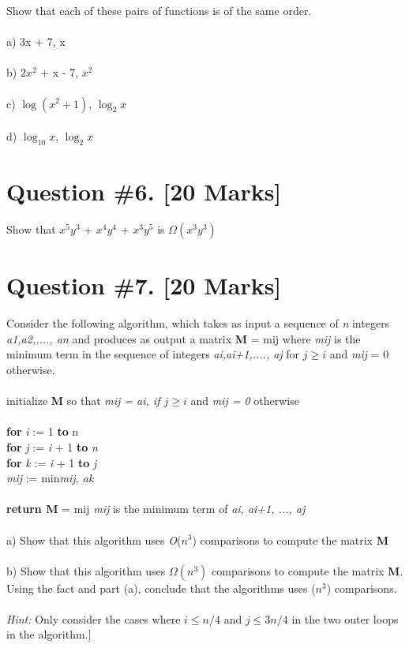 \documentclass{article}
\begin{document}
Show that each of these pairs of functions is of the same order. \\ \\
a) 3x + 7, x \\\\
b) 2$x^2$ + x - 7, $x^2$ \\ \\ 
c) $\log(x^2 + 1 )$, $\log_{2}{x}$ \\ \\ 
d) $\log_{10}{x}$, $\log_{2}{x}$
\newpage 
\section{Question \#6. [20 Marks]}

Show that $x^5$$y^3$ + $x^4$$y^4$ + $x^3$$y^5$ is $\Omega(x^3y^3)$
\newpage
\section{Question \#7. [20 Marks]}
Consider the following algorithm, which takes as input a sequence of \emph{n} integers \emph{a1,a2,...., an} and produces as output a matrix \textbf{M} = {mij} where \emph{mij} is the minimum term in the sequence of integers \emph{ai,ai+1,...., aj} for \emph {$j \geq i$} and \emph {mij} = 0 otherwise. \\ \\ \indent initialize \textbf {M} so that \emph{mij = ai, if $j \geq i$} and \emph{mij = 0 }otherwise \\ \\ \indent \textbf{for} \emph{i} := 1 \textbf {to} n \\ 
\indent \indent \textbf {for} \emph{j} := \emph {i} + 1 \textbf{to} \emph{n} \\ 
\indent \indent \indent \textbf {for} \emph{k} := \emph {i} + 1 \textbf{to} \emph{j} \\ 
\indent \indent \indent \indent \emph{mij} := min\emph{mij, ak} \\ \\ 
\indent \textbf{return M} = {mij} {\emph{mij} is the minimum term of \emph{ai, ai+1, ..., aj}} \\ \\ 
a) Show that this algorithm uses \emph{O}($n^3$) comparisons to compute the matrix \textbf {M} \\ \\ 
b) Show that this algorithm uses $\Omega(n^3)$ comparisons to compute the matrix \textbf {M}. Using the fact and part (a), conclude that the algorithms uses ($n^3$) comparisons. \\ \\ \emph{Hint:} Only consider the cases where \emph{$i \leq n/4$} and \emph {$j \leq 3n/4$} in the two outer loops in the algorithm.] 
\newpage
\end{document}
